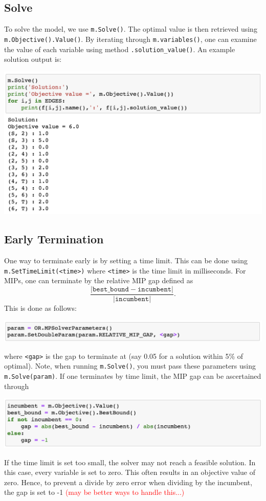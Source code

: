 \documentclass[11 pt]{article}
\newcommand{\code}[1]{\colorbox{gray!10}{\textcolor{black!85}{\texttt{#1}}}}
\begin{document}
\subsection{Solve}

To solve the model, we use \code{m.Solve()}. The optimal value is then retrieved using \code{m.Objective().Value()}. By iterating through \code{m.variables()}, one can examine the value of each variable using method \code{.solution\_value()}. An example solution output is:
\begin{center}
\includegraphics[scale=0.7]{sol.png}
\end{center}

\subsection{Early Termination}

One way to terminate early is by setting a time limit. This can be done using \code{m.SetTimeLimit(<time>)} where \texttt{<time>} is the time limit in milliseconds. For MIPs, one can terminate by the relative MIP gap defined as 
$$\frac{|\texttt{best\_bound} - \texttt{incumbent}|}{|\texttt{incumbent}|}.$$
This is done as follows: 
\begin{center}
\includegraphics[scale=0.7]{gap.png}
\end{center}
where \texttt{<gap>} is the gap to terminate at (say 0.05 for a solution within 5\% of optimal). Note, when running \code{m.Solve()}, you must pass these parameters using \code{m.Solve(param)}. If one terminates by time limit, the MIP gap can be ascertained through
\begin{center}
\includegraphics[scale=0.7]{gapDef.png}
\end{center}
If the time limit is set too small, the solver may not reach a feasible solution. In this case, every variable is set to zero. This often results in an objective value of zero. Hence, to prevent a divide by zero error when dividing by the incumbent, the gap is set to -1 \textcolor{red}{(may be better ways to handle this...)}
\end{document}

